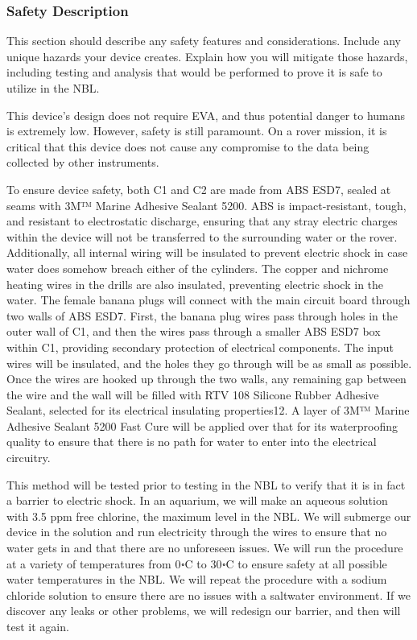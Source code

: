 \documentclass{article}
\begin{document}
\subsubsection{Safety Description}
This section should describe any safety features and considerations. Include any unique hazards your device creates. Explain how you will mitigate those hazards, including testing and analysis that would be performed to prove it is safe to utilize in the NBL.\par
This device’s design does not require EVA, and thus potential danger to humans is extremely low. However, safety is still paramount. On a rover mission, it is critical that this device does not cause any compromise to the data being collected by other instruments. \par
To ensure device safety, both C1 and C2 are made from ABS ESD7, sealed at seams with 3M™ Marine Adhesive Sealant 5200. ABS is impact-resistant, tough, and resistant to electrostatic discharge, ensuring that any stray electric charges within the device will not be transferred to the surrounding water or the rover. Additionally, all internal wiring will be insulated to prevent electric shock in case water does somehow breach either of the cylinders. The copper and nichrome heating wires in the drills are also insulated, preventing electric shock in the water. The female banana plugs will connect with the main circuit board through two walls of ABS ESD7. First, the banana plug wires pass through holes in the outer wall of C1, and then the wires pass through a smaller ABS ESD7 box within C1, providing secondary protection of electrical components. The input wires will be insulated, and the holes they go through will be as small as possible. Once the wires are hooked up through the two walls, any remaining gap between the wire and the wall will be filled with RTV 108 Silicone Rubber Adhesive Sealant, selected for its electrical insulating properties12. A layer of 3M™ Marine Adhesive Sealant 5200 Fast Cure will be applied over that for its waterproofing quality to ensure that there is no path for water to enter into the electrical circuitry.\par
This method will be tested prior to testing in the NBL to verify that it is in fact a barrier to electric shock. In an aquarium, we will make an aqueous solution with 3.5 ppm free chlorine, the maximum level in the NBL. We will submerge our device in the solution and run electricity through the wires to ensure that no water gets in and that there are no unforeseen issues. We will run the procedure at a variety of temperatures from 0॰C to 30॰C to ensure safety at all possible water temperatures in the NBL. We will repeat the procedure with a sodium chloride solution to ensure there are no issues with a saltwater environment. If we discover any leaks or other problems, we will redesign our barrier, and then will test it again.\par
\end{document}

